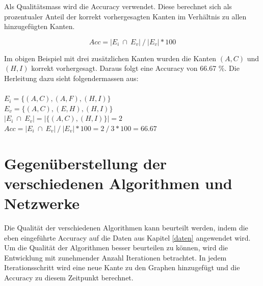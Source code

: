 Als Qualitätsmass wird die Accuracy verwendet.
Diese berechnet sich als prozentualer Anteil der korrekt vorhergesagten Kanten im Verhältnis zu allen hinzugefügten Kanten.

\begin{equation}
    \label{eq:acc}
    Acc = | E_i \ \cap \ E_v| \ / \ |E_v| * 100
\end{equation}

Im obigen Beispiel mit drei zusätzlichen Kanten wurden die Kanten $(A,C)$ und $(H,I)$ korrekt vorhergesagt.
Daraus folgt eine Accuracy von 66.67 \%.
Die Herleitung dazu sieht folgendermassen aus:\\
\\
\vspace{4mm}
\forceindent $E_i = \{(A,C), (A,F), (H,I)\}$\\
\vspace{4mm}
\forceindent $E_v = \{(A,C), (E,H), (H,I)\}$\\
\vspace{4mm}
\forceindent $| E_i \ \cap \ E_v| = |\{(A,C), (H,I)\}| = 2$\\
\vspace{4mm}
\forceindent $Acc = | E_i \ \cap \ E_v| \ / \ |E_v| * 100 = 2 \ / \ 3 * 100 = 66.67$\\

\section{Gegenüberstellung der verschiedenen Algorithmen und Netzwerke}
\label{comparison}
Die Qualität der verschiedenen Algorithmen kann beurteilt werden, indem die eben eingeführte Accuracy auf die Daten aus Kapitel \ref{daten} angewendet wird.
Um die Qualität der Algorithmen besser beurteilen zu können, wird die Entwicklung mit zunehmender Anzahl Iterationen betrachtet.
In jedem Iterationsschritt wird eine neue Kante zu den Graphen hinzugefügt und die Accuracy zu diesem Zeitpunkt berechnet.

